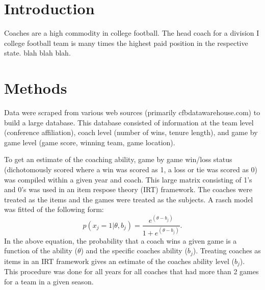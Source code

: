 \documentclass[letterpaper,12pt]{article}
\begin{document}

\section{Introduction}
Coaches are a high commodity in college football. The head coach for a division I college football team is many times the highest paid position in the respective state. blah blah blah.

\section{Methods}
Data were scraped from various web sources (primarily cfbdatawarehouse.com) to build a large database. This database consisted of information at the team level (conference affiliation),  coach level (number of wins, tenure length), and game by game level (game score, winning team, game location). 

To get an estimate of the coaching ability, game by game win/loss status (dichotomously scored where a win was scored as 1, a loss or tie was scored as 0) was compiled within a given year and coach. This large matrix consisting of 1's and 0's was used in an item respose theory (IRT) framework. The coaches were treated as the items and the games were treated as the subjects. A rasch model was fitted of the following form:
\begin{equation}
p\left({x_{j} = 1 | \theta, b_{j}}\right) = \frac{e^{(\theta - b_{j})}}{1 + e^{(\theta - b_{j})}}.
\end{equation}
In the above equation, the probability that a coach wins a given game is a function of the ability ($\theta$) and the specific coaches ability ($b_{j}$). Treating coaches as items in an IRT framework gives an estimate of the coaches ability level ($b_{j}$). This procedure was done for all years for all coaches that had more than 2 games for a team in a given season. 
\end{document}
